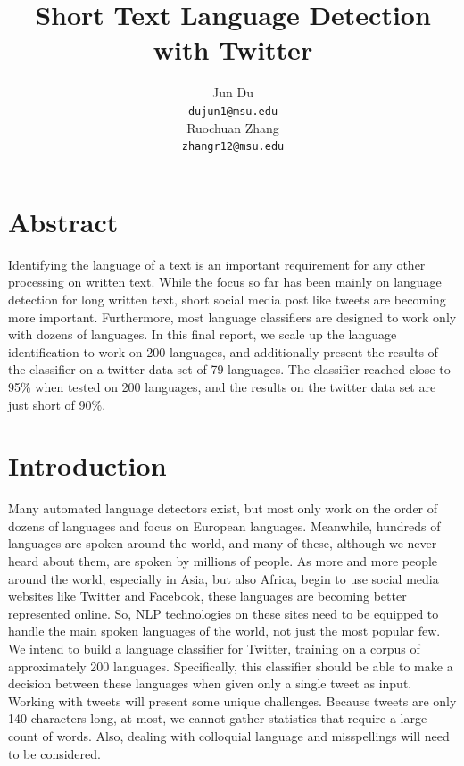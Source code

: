 \documentclass[11pt]{article}
\begin{document}


\title{Short Text Language Detection with Twitter}

\author{Jun Du \\
  {\tt dujun1@msu.edu} \\\And
  Ruochuan Zhang \\
  {\tt zhangr12@msu.edu} \\}

\date{}

\maketitle
\section{Abstract}
Identifying the language of a text is an important requirement
for any other processing on written text. While the
focus so far has been mainly on language detection for long
written text, short social media post like tweets are becoming
more important. Furthermore, most language classifiers
are designed to work only with dozens of languages. In this
final report, we scale up the language identification to work on
200 languages, and additionally present the results of the
classifier on a twitter data set of 79 languages. The classifier
reached close to 95\% when tested on 200 languages,
and the results on the twitter data set are just short of 90\%.


\section{Introduction}
Many automated language detectors exist, but most only
work on the order of dozens of languages and focus on European
languages. Meanwhile, hundreds of languages are
spoken around the world, and many of these, although we
never heard about them, are spoken by millions of people.
As more and more people around the world, especially in
Asia, but also Africa, begin to use social media websites like
Twitter and Facebook, these languages are becoming better
represented online. So, NLP technologies on these sites need
to be equipped to handle the main spoken languages of the
world, not just the most popular few.
We intend to build a language classifier for Twitter, training
on a corpus of approximately 200 languages. Specifically,
this classifier should be able to make a decision between
these languages when given only a single tweet as input.
Working with tweets will present some unique challenges.
Because tweets are only 140 characters long, at most, we
cannot gather statistics that require a large count of words.
Also, dealing with colloquial language and misspellings will
need to be considered.
\end{document}
